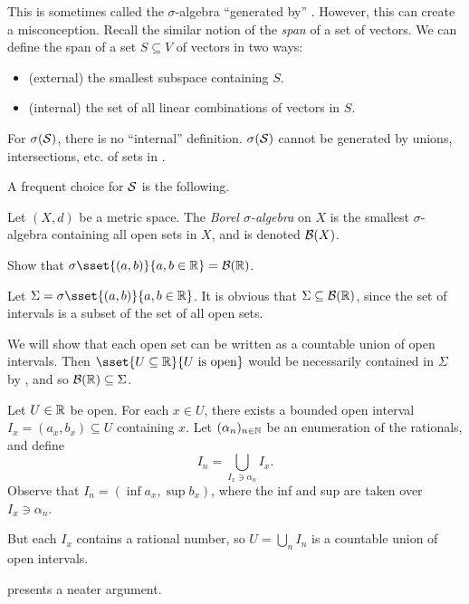 This is sometimes called the $\sigma$-algebra ``generated by'' \mcS.
However, this can create a misconception.
Recall the similar notion of the \emph{span} of a set of vectors.
We can define the span of a set $S \subseteq V$ of vectors in two ways:
\begin{itemize}
    \item (external) the smallest subspace containing $S$.
    \item (internal) the set of all linear combinations of vectors in $S$.
\end{itemize}
For $\sigma(\mathcal{S})$, there is no ``internal'' definition.
$\sigma(\mathcal{S})$ cannot be generated by unions, intersections, etc. of sets in
\mcS.

A frequent choice for $\mathcal{S}$ is the following.
\begin{definition*} \label{def:borel}
    Let $(X, d)$ be a metric space.
    The \emph{Borel $\sigma$-algebra} on $X$ is the smallest
    $\sigma$-algebra containing all open sets in $X$, and is denoted
    $\mathcal B(X)$.
\end{definition*}
\begin{exercise}[self] \label{thm:borel-R}
    Show that $\sigma\sset{(a, b)}{a, b \in \R} = \B(\R)$.
\end{exercise}
\begin{solution}
    Let $\Sigma = \sigma\sset{(a, b)}{a, b \in \R}$.
    It is obvious that $\Sigma \subseteq \mathcal B(\mathbb{R})$, since the set of
    intervals is a subset of the set of all open sets.

    We will show that each open set can be written as a countable union
    of open intervals.
    Then $\sset{U \subseteq \R}{U \text{ is open}}$ would be
    necessarily contained in $\Sigma$ by ,
    and so $\mathcal B(\mathbb{R}) \subseteq \Sigma$.

    Let $U \in \mathbb{R}$ be open.
    For each $x \in U$, there exists a bounded open interval
    $I_x = (a_x, b_x) \subseteq U$ containing $x$.
    Let $(\alpha_n)_{n \in \mathbb{N}}$ be an enumeration of the rationals,
    and define \[
        I_n = \bigcup_{I_x \ni \alpha_n} I_x.
    \] Observe that $I_n = (\inf a_x, \sup b_x)$,
    where the inf and sup are taken over $I_x \ni \alpha_n$.

    But each $I_x$ contains a rational number,
    so $U = \bigcup_n I_n$ is a countable union of open intervals.
\end{solution}
 presents a neater argument.

